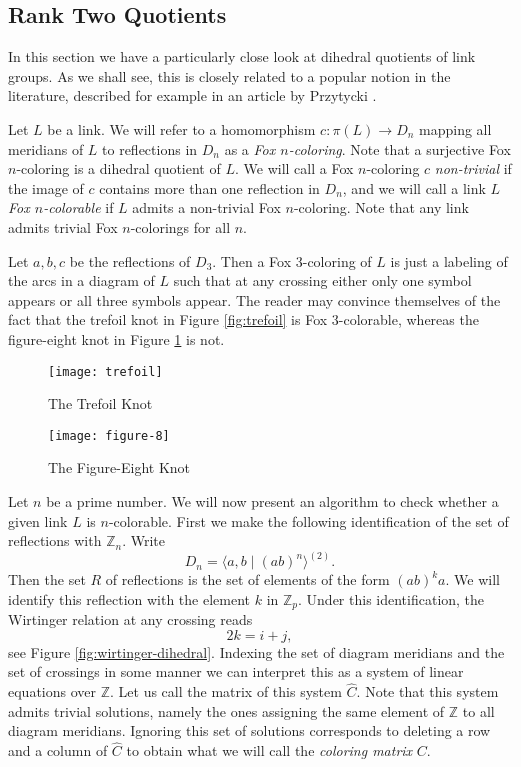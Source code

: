\documentclass[main.tex]{subfiles}
\begin{document}
\subsection{Rank Two Quotients}\label{subsec:rank-two}
In this section we have a particularly close look at dihedral quotients of link groups. As we shall see, this is closely related to a popular notion in the literature, described for example in an article by Przytycki \cite{przytycki1998}. 

Let $L$ be a link. We will refer to a homomorphism $c: \pi(L) \rightarrow D_n$ mapping all meridians of $L$ to reflections in $D_n$ as a \textit{Fox $n$-coloring}. Note that a surjective Fox $n$-coloring is a dihedral quotient of $L$. We will call a Fox $n$-coloring $c$ \textit{non-trivial} if the image of $c$ contains more than one reflection in $D_n$, and we will call a link $L$ \textit{Fox $n$-colorable} if $L$ admits a non-trivial Fox $n$-coloring. Note that any link admits trivial Fox $n$-colorings for all $n$.

\begin{example}
Let $a, b, c$ be the reflections of $D_3$. Then a Fox $3$-coloring of $L$ is just a labeling of the arcs in a diagram of $L$ such that at any crossing either only one symbol appears or all three symbols appear.
The reader may convince themselves of the fact that the trefoil knot in Figure \ref{fig:trefoil} is Fox $3$-colorable, whereas the figure-eight knot in Figure \ref{fig:figure-8} is not.

\begin{figure}[ht]
\centering
\begin{minipage}{0.5\textwidth}
 \centering
\texttt{[image: trefoil]}
\caption{The Trefoil Knot}
\label{fig:trefoil}
\end{minipage}%
\begin{minipage}{0.5\textwidth}
\centering
\texttt{[image: figure-8]}
\caption{The Figure-Eight Knot}
\label{fig:figure-8}
\end{minipage}
\end{figure}
\end{example}

Let $n$ be a prime number. We will now present an algorithm to check whether a given link $L$ is $n$-colorable. First we make the following identification of the set of reflections with $\mathbb{Z}_n$. Write $$D_n = \langle a, b \; | \; (ab)^n \rangle^{(2)}.$$ Then the set $R$ of reflections is the set of elements of the form $(ab)^ka$. We will identify this reflection with the element $k$ in $\mathbb{Z}_p$.
Under this identification, the Wirtinger relation at any crossing reads $$2k = i + j,$$ see Figure \ref{fig:wirtinger-dihedral}. Indexing the set of diagram meridians and the set of crossings in some manner we can interpret this as a system of linear equations over $\mathbb{Z}$. Let us call the matrix of this system $\widehat{C}$. Note that this system admits trivial solutions, namely the ones assigning the same element of $\mathbb{Z}$ to all diagram meridians. Ignoring this set of solutions corresponds to deleting a row and a column of $\widehat{C}$ to obtain what we will call the \textit{coloring matrix} $C$.
\end{document}
